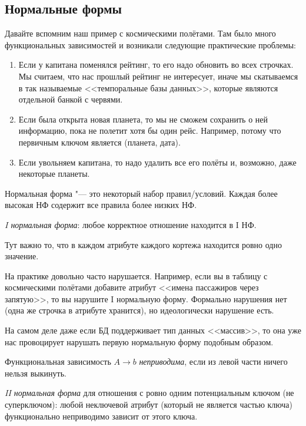 \subsection{Нормальные формы}
	Давайте вспомним наш пример с космическими полётами.
	Там было много функциональных зависимостей и возникали следующие практические проблемы:
	\begin{enumerate}
		\item
			Если у капитана поменялся рейтинг, то его надо обновить во всех строчках.
			Мы считаем, что нас прошлый рейтинг не интересует, иначе мы скатываемся в
			так называемые <<темпоральные базы данных>>, которые являются отдельной банкой с червями.
		\item
			Если была открыта новая планета, то мы не сможем сохранить о ней информацию,
			пока не полетит хотя бы один рейс.
			Например, потому что первичным ключом является (планета, дата).
		\item
			Если увольняем капитана, то надо удалить все его полёты и, возможно, даже некоторые планеты.
	\end{enumerate}

	Нормальная форма "--- это некоторый набор правил/условий.
	Каждая более высокая НФ содержит все правила более низких НФ.
	\begin{Def}
		\textit{I нормальная форма}: любое корректное отношение находится в I НФ.
	\end{Def}
	\begin{Rem}
		Тут важно то, что в каждом атрибуте каждого кортежа находится ровно одно значение.
	\end{Rem}
	\begin{Rem}
		На практике довольно часто нарушается.
		Например, если вы в таблицу с космическими полётами добавите атрибут <<имена пассажиров через запятую>>,
		то вы нарушите I нормальную форму.
		Формально нарушения нет (одна же строчка в атрибуте хранится), но идеологически нарушение есть.

		На самом деле даже если БД поддерживает тип данных <<массив>>, то она уже нас провоцирует
		нарушать первую нормальную форму подобным образом.
	\end{Rem}

	\begin{Def}
		Функциональная зависимость $A\rightarrow b$ \textit{неприводима},
		если из левой части ничего нельзя выкинуть.
	\end{Def}
	\begin{Def}
		\textit{II нормальная форма} для отношения с ровно одним потенциальным ключом (не суперключом):
		любой неключевой атрибут (который не является частью ключа) функционально неприводимо зависит от этого ключа.
	\end{Def}

